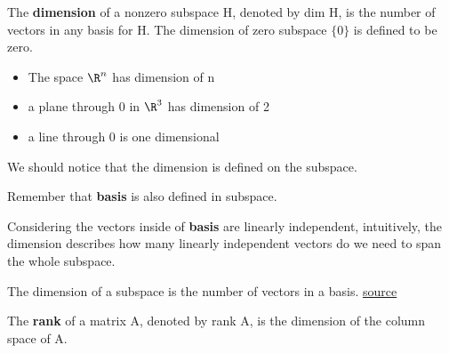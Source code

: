 \begin{definition}
    The \textbf{dimension} of a nonzero subspace H, denoted by dim H, is the number of vectors in any basis for H. The dimension of zero subspace \(\{ 0 \} \) is defined to be zero.
\end{definition}

\begin{itemize}
    \item The space \(\R^n\) has dimension of n 
    \item a plane through 0 in \(\R^3\) has dimension of 2 
    \item a line through 0 is one dimensional
\end{itemize}

\begin{remark}
    We should notice that the dimension is defined on the subspace.  

    Remember that \textbf{basis} is also defined in subspace. 

    Considering the vectors inside of \textbf{basis} are linearly independent, intuitively, the dimension describes how many linearly independent vectors do we need to span the whole subspace.
\end{remark}

\begin{definition}
    The dimension of a subspace is the number of vectors in a basis. \href{https://math.mit.edu/~gs/linearalgebra/ila6/ila6_3_5.pdf}{source}
\end{definition}


\begin{definition}
    The \textbf{rank} of a matrix A, denoted by rank A, is the dimension of the column space of A.
\end{definition}

